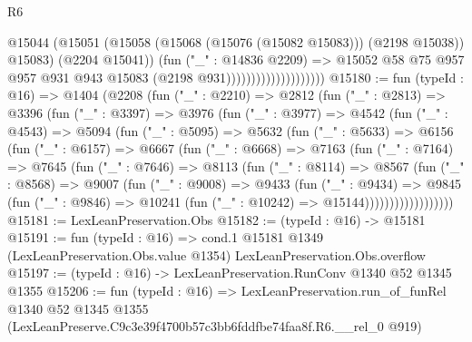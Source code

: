 \begin{lexlean}{R6}
\begin{coremodule}
                                        @15044
                                          (@15051
                                            (@15058
                                              (@15068 (@15076 (@15082 @15083)))
                                              (@2198 @15038))
                                            @15083)
                                          (@2204 @15041))
                                        (fun ("_" : @14836 @2209) =>
                                        @15052
                                          @58
                                          @75
                                          @957
                                          @957
                                          @931
                                          @943
                                          @15083
                                          (@2198 @931))))))))))))))))))))
@15180 := fun (typeId : @16) =>
  @1404
    (@2208
      (fun ("_" : @2210) =>
      @2812
        (fun ("_" : @2813) =>
        @3396
          (fun ("_" : @3397) =>
          @3976
            (fun ("_" : @3977) =>
            @4542
              (fun ("_" : @4543) =>
              @5094
                (fun ("_" : @5095) =>
                @5632
                  (fun ("_" : @5633) =>
                  @6156
                    (fun ("_" : @6157) =>
                    @6667
                      (fun ("_" : @6668) =>
                      @7163
                        (fun ("_" : @7164) =>
                        @7645
                          (fun ("_" : @7646) =>
                          @8113
                            (fun ("_" : @8114) =>
                            @8567
                              (fun ("_" : @8568) =>
                              @9007
                                (fun ("_" : @9008) =>
                                @9433
                                  (fun ("_" : @9434) =>
                                  @9845
                                    (fun ("_" : @9846) =>
                                    @10241 (fun ("_" : @10242) => @15144))))))))))))))))))
@15181 := LexLeanPreservation.Obs
@15182 := (typeId : @16) -> @15181
@15191 := fun (typeId : @16) =>
  cond.{1} @15181 @1349 (LexLeanPreservation.Obs.value @1354) LexLeanPreservation.Obs.overflow
@15197 := (typeId : @16) -> LexLeanPreservation.RunConv @1340 @52 @1345 @1355
@15206 := fun (typeId : @16) =>
  LexLeanPreservation.run_of_funRel
    @1340
    @52
    @1345
    @1355
    (LexLeanPreserve.C9c3e39f4700b57c3bb6fddfbe74faa8f.R6.__rel_0 @919)
\end{coremodule}
\end{lexlean}
